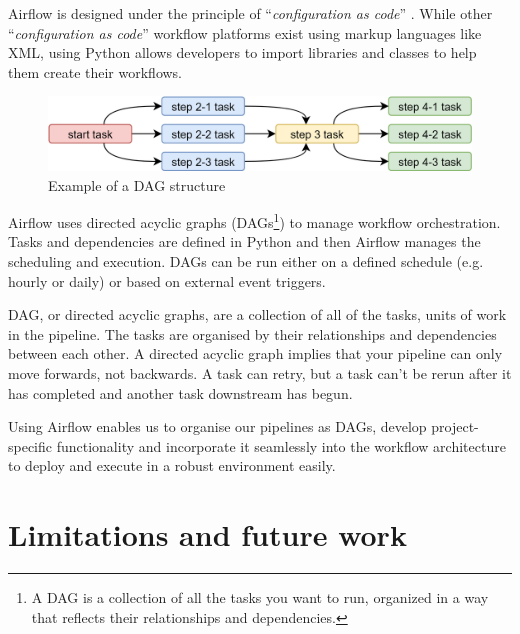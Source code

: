 Airflow is designed under the principle of ``\textit{configuration as code}'' . While other ``\textit{configuration as code}''  workflow platforms exist using markup languages like XML, using Python allows developers to import libraries and classes to help them create their workflows.

\begin{Center}
\begin{figure}[H]
	\begin{Center}
		\includegraphics[width=\textwidth]{images/image2.png}
		\caption{Example of a DAG structure}
		\label{fig:Example_of_a_DAG_structure}
	\end{Center}
\end{figure}
\end{Center}

Airflow uses directed acyclic graphs (DAGs\footnote{ A DAG is a collection of all the tasks you want to run, organized in a way that reflects their relationships and dependencies. }) to manage workflow orchestration. Tasks and dependencies are defined in Python and then Airflow manages the scheduling and execution. DAGs can be run either on a defined schedule (e.g. hourly or daily) or based on external event triggers.

DAG, or directed acyclic graphs, are a collection of all of the tasks, units of work in the pipeline. The tasks are organised by their relationships and dependencies between each other. A directed acyclic graph implies that your pipeline can only move forwards, not backwards. A task can retry, but a task can't be rerun after it has completed and another task downstream has begun.

Using Airflow enables us to organise our pipelines as DAGs, develop project-specific functionality and incorporate it seamlessly into the workflow architecture to deploy and execute in a robust environment easily.

\section{Limitations and future work}

